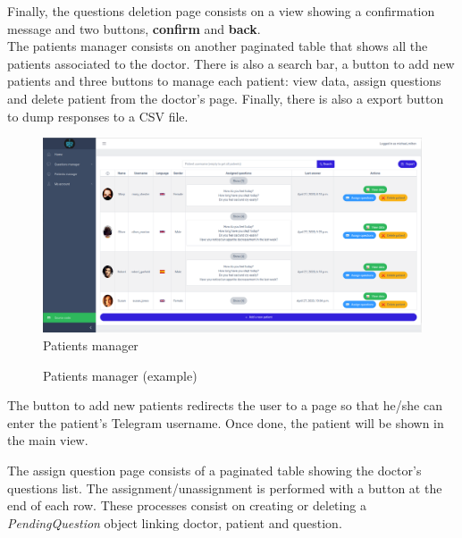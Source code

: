 \documentclass[12pt,english]{article}
\begin{document}
Finally, the questions deletion page consists on a view showing a confirmation message and two buttons, \textbf{confirm} and \textbf{back}.
\\

The patients manager consists on another paginated table that shows all the patients associated to the doctor. There is also a search bar, a button to add new patients and three buttons to manage each patient: view data, assign questions and delete patient from the doctor's page. Finally, there is also a export button to dump responses to a CSV file.

\begin{figure}[H]
  \centering
    \includegraphics[width=\textwidth]{patients_manager.png}
  \caption{Patients manager}
\end{figure}

\begin{figure}[H]
    \caption{Patients manager (example)}
\end{figure}

The button to add new patients redirects the user to a page so that he/she can enter the patient's Telegram username. Once done, the patient will be shown in the main view.

The assign question page consists of a paginated table showing the doctor's questions list. The assignment/unassignment is performed with a button at the end of each row. These processes consist on creating or deleting a \emph{PendingQuestion} object linking doctor, patient and question.
\end{document}
